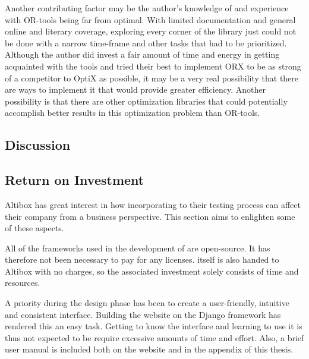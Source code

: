 Another contributing factor may be the author's knowledge of and experience with OR-tools being far from optimal. With limited documentation and general online and literary coverage, exploring every corner of the library just could not be done with a narrow time-frame and other tasks that had to be prioritized. Although the author did invest a fair amount of time and energy in getting acquainted with the tools and tried their best to implement ORX to be as strong of a competitor to OptiX as possible, it may be a very real possibility that there are ways to implement it that would provide greater efficiency. Another possibility is that there are other optimization libraries that could potentially accomplish better results in this optimization problem than OR-tools.

\subsection{Discussion}












\subsection{Return on Investment}

Altibox has great interest in how incorporating \toolname \space to their testing process can affect their company from a business perspective. This section aims to enlighten some of these aspects.

All of the frameworks used in the development of \toolname \space are open-source. It has therefore not been necessary to pay for any licenses. \toolname \space itself is also handed to Altibox with no charges, so the associated investment solely consists of time and resources.

A priority during the design phase has been to create a user-friendly, intuitive and consistent interface. Building the website on the Django framework has rendered this an easy task. Getting to know the interface and learning to use it is thus not expected to be require excessive amounts of time and effort. Also, a brief user manual is included both on the website and in the appendix of this thesis.

